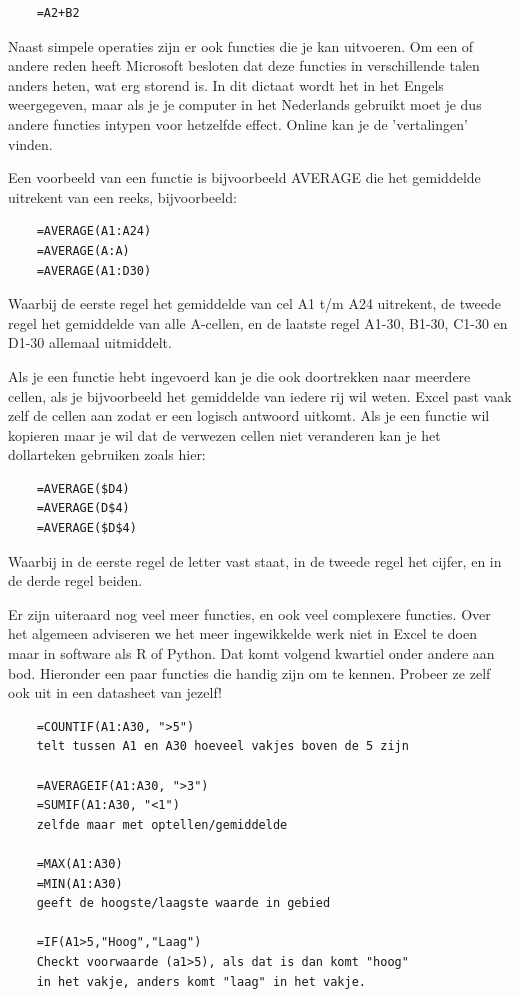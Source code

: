 \begin{verbatim}
    =A2+B2
\end{verbatim}

Naast simpele operaties zijn er ook functies die je kan uitvoeren. Om een of andere reden heeft Microsoft besloten dat deze functies in verschillende talen anders heten, wat erg storend is. In dit dictaat wordt het in het Engels weergegeven, maar als je je computer in het Nederlands gebruikt moet je dus andere functies intypen voor hetzelfde effect. Online kan je de 'vertalingen' vinden. 

Een voorbeeld van een functie is bijvoorbeeld AVERAGE die het gemiddelde uitrekent van een reeks, bijvoorbeeld:
\begin{verbatim}
    =AVERAGE(A1:A24)
    =AVERAGE(A:A)
    =AVERAGE(A1:D30)
\end{verbatim}
Waarbij de eerste regel het gemiddelde van cel A1 t/m A24 uitrekent, de tweede regel het gemiddelde van alle A-cellen, en de laatste regel A1-30, B1-30, C1-30 en D1-30 allemaal uitmiddelt. 

Als je een functie hebt ingevoerd kan je die ook doortrekken naar meerdere cellen, als je bijvoorbeeld het gemiddelde van iedere rij wil weten. Excel past vaak zelf de cellen aan zodat er een logisch antwoord uitkomt. Als je een functie wil kopieren maar je wil dat de verwezen cellen niet veranderen kan je het dollarteken gebruiken zoals hier:
\begin{verbatim}
    =AVERAGE($D4)
    =AVERAGE(D$4)
    =AVERAGE($D$4)
\end{verbatim}
Waarbij in de eerste regel de letter vast staat, in de tweede regel het cijfer, en in de derde regel beiden.

Er zijn uiteraard nog veel meer functies, en ook veel complexere functies. Over het algemeen adviseren we het meer ingewikkelde werk niet in Excel te doen maar in software als R of Python. Dat komt volgend kwartiel onder andere aan bod. Hieronder een paar functies die handig zijn om te kennen. Probeer ze zelf ook uit in een datasheet van jezelf!

\begin{verbatim}
    =COUNTIF(A1:A30, ">5")
    telt tussen A1 en A30 hoeveel vakjes boven de 5 zijn
    
    =AVERAGEIF(A1:A30, ">3")
    =SUMIF(A1:A30, "<1")
    zelfde maar met optellen/gemiddelde
    
    =MAX(A1:A30)
    =MIN(A1:A30)
    geeft de hoogste/laagste waarde in gebied
    
    =IF(A1>5,"Hoog","Laag")
    Checkt voorwaarde (a1>5), als dat is dan komt "hoog"
    in het vakje, anders komt "laag" in het vakje.
\end{verbatim}

